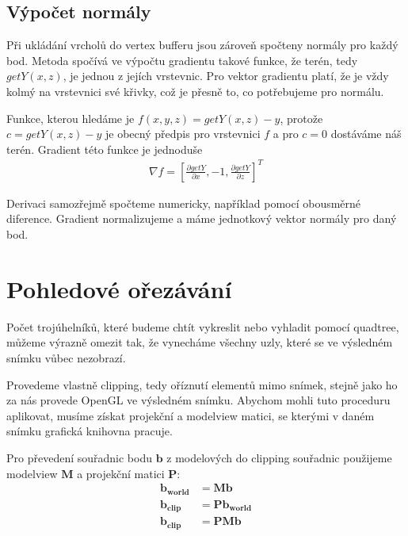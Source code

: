 \documentclass{zcu_sp}
\begin{document}
\subsection{Výpočet normály}
Při ukládání vrcholů do vertex bufferu jsou zároveň spočteny normály pro každý
bod. Metoda spočívá ve výpočtu gradientu takové funkce, že terén, tedy $getY(x,
z)$, je jednou z jejích vrstevnic. Pro vektor gradientu platí, že je vždy kolmý
na vrstevnici své křivky, což je přesně to, co potřebujeme pro normálu.

Funkce, kterou hledáme je $f(x, y, z) = getY(x, z) - y$, protože $c = getY(x,
z) - y$ je obecný předpis pro vrstevnici $f$ a pro $c = 0$ dostáváme náš terén. 
Gradient této funkce je jednoduše
\begin{align*}
\nabla f = \left[ \frac{\partial getY}{\partial x}, -1, \frac{\partial getY}{\partial z} \right]^T
\end{align*}

Derivaci samozřejmě spočteme numericky, například pomocí obousměrné diference.
Gradient normalizujeme a máme jednotkový vektor normály pro daný bod.


\section{Pohledové ořezávání}
Počet trojúhelníků, které budeme chtít vykreslit nebo vyhladit pomocí quadtree, můžeme výrazně omezit tak, že vynecháme všechny uzly, které se ve výsledném snímku vůbec nezobrazí.

Provedeme vlastně clipping, tedy oříznutí elementů mimo snímek, stejně jako ho
za nás provede OpenGL ve výsledném snímku. Abychom mohli tuto proceduru
aplikovat, musíme získat projekční a modelview matici, se kterými v daném
snímku grafická knihovna pracuje.

Pro převedení souřadnic bodu $\mathbf{b}$ z modelových do clipping souřadnic
použijeme modelview $\mathbf{M}$ a projekční matici $\mathbf{P}$:
\begin{align*}
\mathbf{b_{world}} &= \mathbf{M} \mathbf{b} \\
\mathbf{b_{clip}} &= \mathbf{P} \mathbf{b_{world}} \\
\mathbf{b_{clip}} &= \mathbf{P} \mathbf{M} \mathbf{b} \\
\end{align*}
\end{document}
